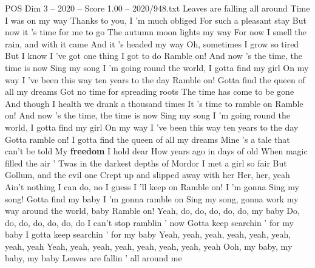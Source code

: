 \begin{textsample}{POS Dim 3 – 2020 – Score 1.00 – 2020/948.txt}  \label{ex:f3_pos_008}
Leaves are falling all around Time I was on my way Thanks to you, I 'm much obliged For such a pleasant stay But now it 's time for me to go The autumn moon lights my way For now I smell the rain, and with it came And it 's headed my way Oh, sometimes I grow so tired But I know I 've got one thing I got to do Ramble on!
And now 's the time, the time is now Sing my song I 'm going round the world, I gotta find my girl On my way I 've been this way ten years to the day Ramble on!
Gotta find the queen of all my dreams Got no time for spreading roots The time has come to be gone And though I health we drank a thousand times It 's time to ramble on Ramble on!
And now 's the time, the time is now Sing my song I 'm going round the world, I gotta find my girl On my way I 've been this way ten years to the day Gotta ramble on!
I gotta find the queen of all my dreams Mine 's a tale that can't be told My \textbf{freedom} I hold dear How years ago in days of old When magic filled the air ' Twas in the darkest depths of Mordor I met a girl so fair But Gollum, and the evil one Crept up and slipped away with her Her, her, yeah Ain't nothing I can do, no I guess I 'll keep on Ramble on!
I 'm gonna Sing my song!
Gotta find my baby I 'm gonna ramble on Sing my song, gonna work my way around the world, baby Ramble on!
Yeah, do, do, do, do, do, my baby Do, do, do, do, do, do, do I can't stop ramblin ' now Gotta keep searchin ' for my baby I gotta keep searchin ' for my baby Yeah, yeah, yeah, yeah, yeah, yeah, yeah, yeah Yeah, yeah, yeah, yeah, yeah, yeah, yeah, yeah Ooh, my baby, my baby, my baby Leaves are fallin ' all around me

\end{textsample}
